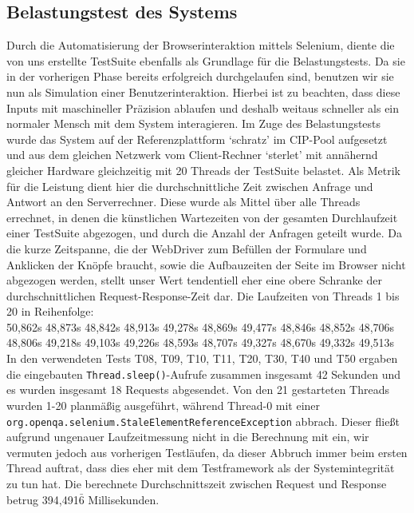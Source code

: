 \documentclass{article}
\begin{document}
\subsection{Belastungstest des Systems}
Durch die Automatisierung der Browserinteraktion mittels Selenium, diente die von uns erstellte TestSuite ebenfalls als Grundlage für die Belastungstests. Da sie in der vorherigen Phase bereits erfolgreich durchgelaufen sind, benutzen wir sie nun als Simulation einer Benutzerinteraktion. Hierbei ist zu beachten, dass diese Inputs mit maschineller Präzision ablaufen und deshalb weitaus schneller als ein normaler Mensch mit dem System interagieren. Im Zuge des Belastungstests wurde das System auf der Referenzplattform `schratz' im CIP-Pool aufgesetzt und aus dem gleichen Netzwerk vom Client-Rechner `sterlet'  mit annähernd gleicher Hardware gleichzeitig mit 20 Threads der TestSuite belastet. Als Metrik für die Leistung dient hier die durchschnittliche Zeit zwischen Anfrage und Antwort an den Serverrechner. Diese wurde als Mittel über alle Threads errechnet, in denen die künstlichen Wartezeiten von der gesamten Durchlaufzeit einer TestSuite abgezogen, und durch die Anzahl der Anfragen geteilt wurde. Da die kurze Zeitspanne, die der WebDriver zum Befüllen der Formulare und Anklicken der Knöpfe braucht, sowie die Aufbauzeiten der Seite im Browser nicht abgezogen werden, stellt unser Wert tendentiell eher eine obere Schranke der durchschnittlichen Request-Response-Zeit dar. Die Laufzeiten von Threads 1 bis 20 in Reihenfolge:\\
50,862s 48,873s 48,842s 48,913s 49,278s 48,869s 49,477s 48,846s 48,852s 48,706s \\
48,806s 49,218s 49,103s 49,226s 48,593s 48,707s 49,327s 48,670s 49,332s 49,513s \\
In den verwendeten Tests T08, T09, T10, T11, T20, T30, T40 und T50 ergaben die eingebauten \texttt{Thread.sleep()}-Aufrufe zusammen insgesamt 42 Sekunden und es wurden insgesamt 18 Requests abgesendet. Von den 21 gestarteten Threads wurden 1-20 planmäßig ausgeführt, während Thread-0 mit einer \texttt{org.openqa.selenium.StaleElementReferenceException} abbrach. Dieser fließt aufgrund ungenauer Laufzeitmessung nicht in die Berechnung mit ein, wir vermuten jedoch aus vorherigen Testläufen, da dieser Abbruch immer beim ersten Thread auftrat, dass dies eher mit dem Testframework als der Systemintegrität zu tun hat. Die berechnete Durchschnittszeit zwischen Request und Response betrug 394,491$\bar{6}$ Millisekunden.
\newpage

\end{document}
